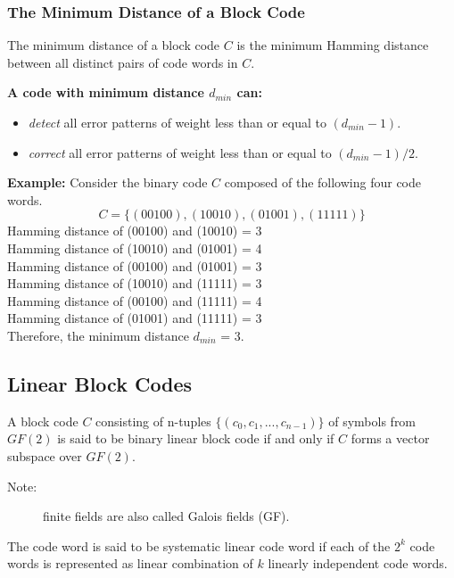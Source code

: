 \subsubsection*{The Minimum Distance of a Block Code}
The minimum distance of a block code $C$ is the minimum Hamming distance between all distinct pairs of code words in $C$.
\begin{GrayBox}
    \textbf{A code with minimum distance $d_{min}$ can:}
    \begin{itemize}
        \item \emph{detect} all error patterns of weight less than or equal to $(d_{min} - 1)$.
        \item \emph{correct} all error patterns of weight less than or equal to $(d_{min} - 1) / 2$.
    \end{itemize}
\end{GrayBox}
\textbf{Example:} Consider the binary code $C$ composed of the following four code words.
\[ C = \{(00100), (10010), (01001), (11111)\} \]
Hamming distance of (00100) and (10010) = 3 \\
Hamming distance of (10010) and (01001) = 4 \\
Hamming distance of (00100) and (01001) = 3 \\
Hamming distance of (10010) and (11111) = 3 \\
Hamming distance of (00100) and (11111) = 4 \\
Hamming distance of (01001) and (11111) = 3 \\
Therefore, the minimum distance $d_{min}$ = 3.

\subsection{Linear Block Codes}
A block code $C$ consisting of n-tuples $\{(c_0, c_1, . . . , c_{n-1})\}$ of symbols from $GF(2)$ is said to be binary linear block code if and only if $C$ forms a vector subspace over $GF(2)$. 
\begin{description}
    \item[Note:] finite fields are also called Galois fields (GF).
\end{description}
The code word is said to be systematic linear code word if each of the $2^k$ code words is represented as linear combination of $k$ linearly independent code words.


